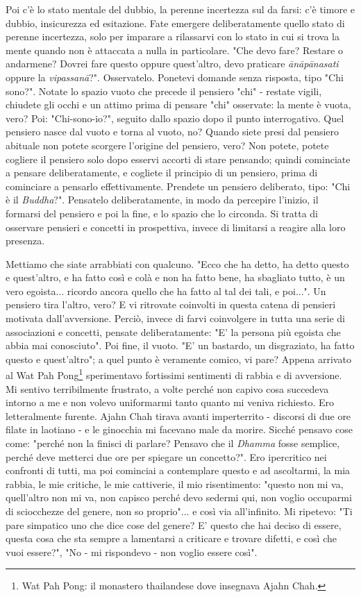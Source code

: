 Poi c'è lo stato mentale del dubbio, la perenne incertezza sul da farsi:
c'è timore e dubbio, insicurezza ed esitazione. Fate emergere
deliberatamente quello stato di perenne incertezza, solo per imparare a
rilassarvi con lo stato in cui si trova la mente quando non è attaccata
a nulla in particolare. "Che devo fare? Restare o andarmene? Dovrei fare
questo oppure quest'altro, devo praticare \textit{ānāpānasati} oppure la
\textit{vipassanā}?". Osservatelo. Ponetevi domande senza risposta, tipo "Chi
sono?". Notate lo spazio vuoto che precede il pensiero "chi" - restate
vigili, chiudete gli occhi e un attimo prima di pensare "chi" osservate:
la mente è vuota, vero? Poi: "Chi-sono-io?", seguito dallo spazio dopo
il punto interrogativo. Quel pensiero nasce dal vuoto e torna al vuoto,
no? Quando siete presi dal pensiero abituale non potete scorgere
l'origine del pensiero, vero? Non potete, potete cogliere il pensiero
solo dopo esservi accorti di stare pensando; quindi cominciate a pensare
deliberatamente, e cogliete il principio di un pensiero, prima di
cominciare a pensarlo effettivamente. Prendete un pensiero deliberato,
tipo: "Chi è il \textit{Buddha}?". Pensatelo deliberatamente, in modo da
percepire l'inizio, il formarsi del pensiero e poi la fine, e lo spazio
che lo circonda. Si tratta di osservare pensieri e concetti in
prospettiva, invece di limitarsi a reagire alla loro presenza.

Mettiamo che siate arrabbiati con qualcuno. "Ecco che ha detto, ha detto
questo e quest'altro, e ha fatto così e colà e non ha fatto bene, ha
sbagliato tutto, è un vero egoista... ricordo ancora quello che ha fatto
al tal dei tali, e poi...". Un pensiero tira l'altro, vero? E vi
ritrovate coinvolti in questa catena di pensieri motivata
dall'avversione. Perciò, invece di farvi coinvolgere in tutta una serie
di associazioni e concetti, pensate deliberatamente: "E' la persona più
egoista che abbia mai conosciuto". Poi fine, il vuoto. "E' un bastardo,
un disgraziato, ha fatto questo e quest'altro"; a quel punto è veramente
comico, vi pare? Appena arrivato al Wat Pah Pong\footnote{Wat Pah Pong: il monastero thailandese dove insegnava
Ajahn Chah.} sperimentavo
fortissimi sentimenti di rabbia e di avversione. Mi sentivo
terribilmente frustrato, a volte perché non capivo cosa succedeva
intorno a me e non volevo uniformarmi tanto quanto mi veniva richiesto.
Ero letteralmente furente. Ajahn Chah tirava avanti imperterrito -
discorsi di due ore filate in laotiano - e le ginocchia mi facevano male
da morire. Sicché pensavo cose come: "perché non la finisci di parlare?
Pensavo che il \textit{Dhamma} fosse semplice, perché deve metterci due ore per
spiegare un concetto?". Ero ipercritico nei confronti di tutti, ma poi
cominciai a contemplare questo e ad ascoltarmi, la mia rabbia, le mie
critiche, le mie cattiverie, il mio risentimento: "questo non mi va,
quell'altro non mi va, non capisco perché devo sedermi qui, non voglio
occuparmi di sciocchezze del genere, non so proprio"... e così via
all'infinito. Mi ripetevo: "Ti pare simpatico uno che dice cose del
genere? E' questo che hai deciso di essere, questa cosa che sta sempre a
lamentarsi a criticare e trovare difetti, e così che vuoi essere?", "No
- mi rispondevo - non voglio essere così".

